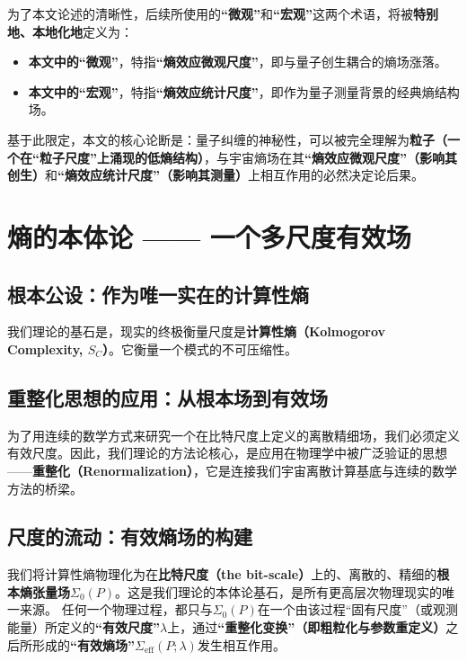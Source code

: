 \documentclass[12pt]{article}
\begin{document}
为了本文论述的清晰性，后续所使用的\textbf{``微观''}和\textbf{``宏观''}这两个术语，将被\textbf{特别地、本地化地}定义为：
\begin{itemize}
    \item   \textbf{本文中的``微观''}，特指\textbf{``熵效应微观尺度''}，即与量子创生耦合的熵场涨落。
    \item   \textbf{本文中的``宏观''}，特指\textbf{``熵效应统计尺度''}，即作为量子测量背景的经典熵结构场。
\end{itemize}

\noindent 基于此限定，本文的核心论断是：量子纠缠的神秘性，可以被完全理解为\textbf{粒子（一个在``粒子尺度''上涌现的低熵结构）}，与宇宙熵场在其\textbf{``熵效应微观尺度''（影响其创生）}和\textbf{``熵效应统计尺度''（影响其测量）}上相互作用的必然决定论后果。



\section{熵的本体论 —— 一个多尺度有效场}

\subsection{根本公设：作为唯一实在的计算性熵}
我们理论的基石是，现实的终极衡量尺度是\textbf{计算性熵（Kolmogorov Complexity, $S_C$）}。它衡量一个模式的不可压缩性。

\subsection{重整化思想的应用：从根本场到有效场}
为了用连续的数学方式来研究一个在比特尺度上定义的离散精细场，我们必须定义有效尺度。因此，我们理论的方法论核心，是应用在物理学中被广泛验证的思想——\textbf{重整化（Renormalization）}，它是连接我们宇宙离散计算基底与连续的数学方法的桥梁。

\subsection{尺度的流动：有效熵场的构建}
我们将计算性熵物理化为在\textbf{比特尺度（the bit-scale）}上的、离散的、精细的\textbf{根本熵张量场$\Sigma_0(P)$}。这是我们理论的本体论基石，是所有更高层次物理现实的唯一来源。
任何一个物理过程，都只与$\Sigma_0(P)$在一个由该过程``固有尺度''（或观测能量）所定义的\textbf{``有效尺度''$\lambda$}上，通过\textbf{``重整化变换''（即粗粒化与参数重定义）}之后所形成的\textbf{``有效熵场''$\Sigma_{\text{eff}}(P; \lambda)$}发生相互作用。
\end{document}
